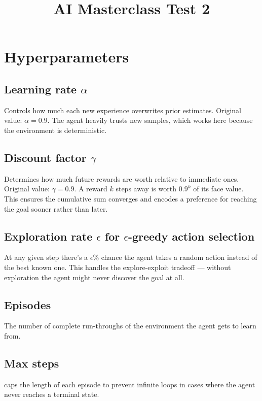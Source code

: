 \documentclass[12pt, a4paper]{article}
\title{AI Masterclass Test 2}
\author{}
\date{}
\begin{document}
\section{Hyperparameters}
\subsection{Learning rate $\alpha$}
Controls how much each new experience overwrites prior estimates.\newline
Original value: $\alpha = 0.9$. The agent heavily trusts new samples, which works here because the environment is deterministic.

\subsection{Discount factor $\gamma$}
Determines how much future rewards are worth relative to immediate ones.\newline
Original value: $\gamma = 0.9$. A reward $k$ steps away is worth $0.9^k$ of its face value. This ensures the cumulative sum converges and encodes a preference for reaching the goal sooner rather than later.

\subsection{Exploration rate $\epsilon$ for $\epsilon$-greedy action selection}
At any given step there's a $\epsilon$\% chance the agent takes a random action instead of the best known one.\newline
This handles the explore-exploit tradeoff — without exploration the agent might never discover the goal at all.

\subsection{Episodes}
The number of complete run-throughs of the environment the agent gets to learn from.

\subsection{Max steps}
caps the length of each episode to prevent infinite loops in cases where the agent never reaches a terminal state.
\end{document}
